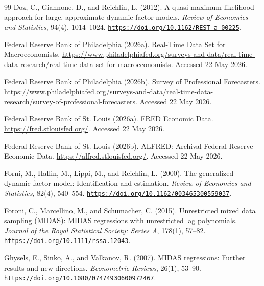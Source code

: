 \documentclass[12pt]{article}
\begin{document}
\begin{thebibliography}{99}
Doz, C., Giannone, D., and Reichlin, L. (2012).
A quasi-maximum likelihood approach for large, approximate dynamic factor models.
\emph{Review of Economics and Statistics}, 94(4), 1014--1024. \href{https://doi.org/10.1162/REST_a_00225}{\nolinkurl{https://doi.org/10.1162/REST_a_00225}}.

Federal Reserve Bank of Philadelphia (2026a).
Real-Time Data Set for Macroeconomists.
\url{https://www.philadelphiafed.org/surveys-and-data/real-time-data-research/real-time-data-set-for-macroeconomists}. Accessed 22 May 2026.

Federal Reserve Bank of Philadelphia (2026b).
Survey of Professional Forecasters.
\url{https://www.philadelphiafed.org/surveys-and-data/real-time-data-research/survey-of-professional-forecasters}. Accessed 22 May 2026.

Federal Reserve Bank of St. Louis (2026a).
FRED Economic Data.
\url{https://fred.stlouisfed.org/}. Accessed 22 May 2026.

Federal Reserve Bank of St. Louis (2026b).
ALFRED: Archival Federal Reserve Economic Data.
\url{https://alfred.stlouisfed.org/}. Accessed 22 May 2026.

Forni, M., Hallin, M., Lippi, M., and Reichlin, L. (2000).
The generalized dynamic-factor model: Identification and estimation.
\emph{Review of Economics and Statistics}, 82(4), 540--554. \href{https://doi.org/10.1162/003465300559037}{\nolinkurl{https://doi.org/10.1162/003465300559037}}.

Foroni, C., Marcellino, M., and Schumacher, C. (2015).
Unrestricted mixed data sampling (MIDAS): MIDAS regressions with unrestricted lag polynomials.
\emph{Journal of the Royal Statistical Society: Series A}, 178(1), 57--82. \href{https://doi.org/10.1111/rssa.12043}{\nolinkurl{https://doi.org/10.1111/rssa.12043}}.

Ghysels, E., Sinko, A., and Valkanov, R. (2007).
MIDAS regressions: Further results and new directions.
\emph{Econometric Reviews}, 26(1), 53--90. \href{https://doi.org/10.1080/07474930600972467}{\nolinkurl{https://doi.org/10.1080/07474930600972467}}.


\end{thebibliography}
\end{document}
